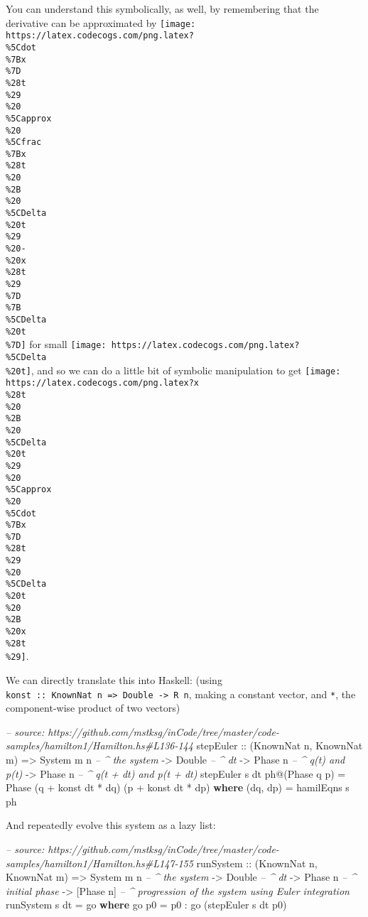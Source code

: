 \documentclass[]{article}
\newenvironment{Shaded}{}{}
\newcommand{\KeywordTok}[1]{\textcolor[rgb]{0.00,0.44,0.13}{\textbf{#1}}}
\newcommand{\DataTypeTok}[1]{\textcolor[rgb]{0.56,0.13,0.00}{#1}}
\newcommand{\CommentTok}[1]{\textcolor[rgb]{0.38,0.63,0.69}{\textit{#1}}}
\newcommand{\OtherTok}[1]{\textcolor[rgb]{0.00,0.44,0.13}{#1}}
\newcommand{\FunctionTok}[1]{\textcolor[rgb]{0.02,0.16,0.49}{#1}}
\newcommand{\NormalTok}[1]{#1}
\begin{document}
You can understand this symbolically, as well, by remembering that the
derivative can be approximated by
\texttt{[image: https://latex.codecogs.com/png.latex?\\\%5Cdot\\\%7Bx\\\%7D\\\%28t\\\%29\\\%20\\\%5Capprox\\\%20\\\%5Cfrac\\\%7Bx\\\%28t\\\%20\\\%2B\\\%20\\\%5CDelta\\\%20t\\\%29\\\%20-\\\%20x\\\%28t\\\%29\\\%7D\\\%7B\\\%5CDelta\\\%20t\\\%7D]}
for small \texttt{[image: https://latex.codecogs.com/png.latex?\\\%5CDelta\\\%20t]},
and so we can do a little bit of symbolic manipulation to get
\texttt{[image: https://latex.codecogs.com/png.latex?x\\\%28t\\\%20\\\%2B\\\%20\\\%5CDelta\\\%20t\\\%29\\\%20\\\%5Capprox\\\%20\\\%5Cdot\\\%7Bx\\\%7D\\\%28t\\\%29\\\%20\\\%5CDelta\\\%20t\\\%20\\\%2B\\\%20x\\\%28t\\\%29]}.

We can directly translate this into Haskell: (using
\texttt{konst\ ::\ KnownNat\ n\ =\textgreater{}\ Double\ -\textgreater{}\ R\ n},
making a constant vector, and \texttt{*}, the component-wise product of two
vectors)

\begin{Shaded}
\begin{Highlighting}[]
\CommentTok{-- source: https://github.com/mstksg/inCode/tree/master/code-samples/hamilton1/Hamilton.hs#L136-144}
\NormalTok{stepEuler}
\OtherTok{    ::}\NormalTok{ (}\DataTypeTok{KnownNat}\NormalTok{ n, }\DataTypeTok{KnownNat}\NormalTok{ m)}
    \OtherTok{=>} \DataTypeTok{System}\NormalTok{ m n       }\CommentTok{-- ^ the system}
    \OtherTok{->} \DataTypeTok{Double}           \CommentTok{-- ^ dt}
    \OtherTok{->} \DataTypeTok{Phase}\NormalTok{ n          }\CommentTok{-- ^ q(t) and p(t)}
    \OtherTok{->} \DataTypeTok{Phase}\NormalTok{ n          }\CommentTok{-- ^ q(t + dt) and p(t + dt)}
\NormalTok{stepEuler s dt ph}\FunctionTok{@}\NormalTok{(}\DataTypeTok{Phase}\NormalTok{ q p) }\FunctionTok{=} \DataTypeTok{Phase}\NormalTok{ (q }\FunctionTok{+}\NormalTok{ konst dt }\FunctionTok{*}\NormalTok{ dq) (p }\FunctionTok{+}\NormalTok{ konst dt }\FunctionTok{*}\NormalTok{ dp)}
  \KeywordTok{where}
\NormalTok{    (dq, dp) }\FunctionTok{=}\NormalTok{ hamilEqns s ph}
\end{Highlighting}
\end{Shaded}

And repeatedly evolve this system as a lazy list:

\begin{Shaded}
\begin{Highlighting}[]
\CommentTok{-- source: https://github.com/mstksg/inCode/tree/master/code-samples/hamilton1/Hamilton.hs#L147-155}
\NormalTok{runSystem}
\OtherTok{    ::}\NormalTok{ (}\DataTypeTok{KnownNat}\NormalTok{ n, }\DataTypeTok{KnownNat}\NormalTok{ m)}
    \OtherTok{=>} \DataTypeTok{System}\NormalTok{ m n       }\CommentTok{-- ^ the system}
    \OtherTok{->} \DataTypeTok{Double}           \CommentTok{-- ^ dt}
    \OtherTok{->} \DataTypeTok{Phase}\NormalTok{ n          }\CommentTok{-- ^ initial phase}
    \OtherTok{->}\NormalTok{ [}\DataTypeTok{Phase}\NormalTok{ n]        }\CommentTok{-- ^ progression of the system using Euler integration}
\NormalTok{runSystem s dt }\FunctionTok{=}\NormalTok{ go}
  \KeywordTok{where}
\NormalTok{    go p0 }\FunctionTok{=}\NormalTok{ p0 }\FunctionTok{:}\NormalTok{ go (stepEuler s dt p0)}
\end{Highlighting}
\end{Shaded}
\end{document}
